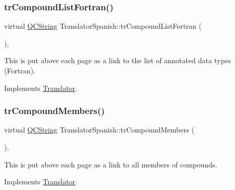 \mbox{\label{class_translator_spanish_af34ada051d491b60197478eed2e175ed}} 
\subsubsection{\texorpdfstring{trCompoundListFortran()}{trCompoundListFortran()}}
{\footnotesize\ttfamily virtual \mbox{\hyperlink{class_q_c_string}{Q\+C\+String}} Translator\+Spanish\+::tr\+Compound\+List\+Fortran (\begin{DoxyParamCaption}{ }\end{DoxyParamCaption})\hspace{0.3cm}{\ttfamily [inline]}, {\ttfamily [virtual]}}

This is put above each page as a link to the list of annotated data types (Fortran). 

Implements \mbox{\hyperlink{class_translator}{Translator}}.

\mbox{\label{class_translator_spanish_a1bce776bcffd970f40b818080e15820e}} 
\subsubsection{\texorpdfstring{trCompoundMembers()}{trCompoundMembers()}}
{\footnotesize\ttfamily virtual \mbox{\hyperlink{class_q_c_string}{Q\+C\+String}} Translator\+Spanish\+::tr\+Compound\+Members (\begin{DoxyParamCaption}{ }\end{DoxyParamCaption})\hspace{0.3cm}{\ttfamily [inline]}, {\ttfamily [virtual]}}

This is put above each page as a link to all members of compounds. 

Implements \mbox{\hyperlink{class_translator}{Translator}}.

\mbox{\label{class_translator_spanish_ae6aefc68ac9cc9d9bad28de74a89a329}} 
